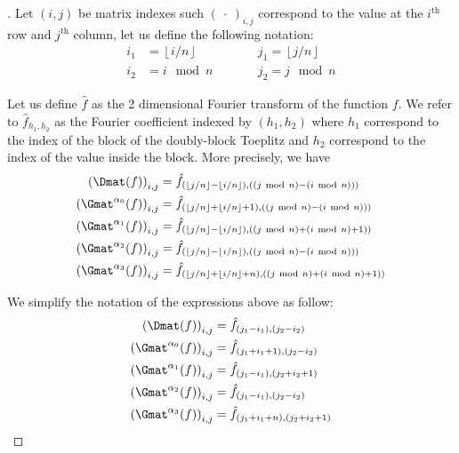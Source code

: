 \begin{proof}[]
Let $(i, j)$ be matrix indexes such $(\ \cdot\ )_{i, j}$ correspond to the value at the $i^\textrm{th}$ row and $j^\textrm{th}$ column, let us define the following notation:
\begin{align*}
    i_1 &= \left\lfloor i/n \right\rfloor \quad \quad &&j_1 = \left\lfloor j/n \right\rfloor \\
    i_2 &= i \mod n \quad \quad &&j_2 = j \mod n
\end{align*}

\noindent
Let us define $\hat{f}$ as the 2 dimensional Fourier transform of the function $f$. We refer to $\hat{f}_{h_1, h_2}$ as the Fourier coefficient indexed by $(h_1, h_2)$ where $h_1$ correspond to the index of the block of the doubly-block Toeplitz and $h_2$ correspond to the index of the value inside the block. More precisely, we have 
\begin{align}
    \leftmat \Dmat(f) \rightmat_{i, j} &= \hat{f}_{(\left\lfloor j/n \right\rfloor - \left\lfloor i/n \right\rfloor), ((j \mod n) - (i \mod n)))} \label{equation:expression_fourier} \\
    \leftmat \Gmat^{\alpha_0}(f) \rightmat_{i, j} &= \hat{f}_{(\left\lfloor j/n \right\rfloor + \left\lfloor i/n \right\rfloor + 1), ((j \mod n) - (i \mod n)))} \\
    \leftmat \Gmat^{\alpha_1}(f) \rightmat_{i, j} &= \hat{f}_{(\left\lfloor j/n \right\rfloor - \left\lfloor i/n \right\rfloor), ((j \mod n) + (i \mod n) + 1))} \\
    \leftmat \Gmat^{\alpha_2}(f) \rightmat_{i, j} &= \hat{f}_{(\left\lfloor j/n \right\rfloor - \left\lfloor i/n \right\rfloor), ((j \mod n) - (i \mod n)))} \\
    \leftmat \Gmat^{\alpha_3}(f) \rightmat_{i, j} &= \hat{f}_{(\left\lfloor j/n \right\rfloor + \left\lfloor i/n \right\rfloor + n), ((j \mod n) + (i \mod n) + 1))}
\end{align}

\noindent
We simplify the notation of the expressions above as follow:
\begin{align}
    \leftmat \Dmat(f) \rightmat_{i, j} &= \hat{f}_{(j_1 - i_1), (j_2 - i_2 )} \\
    \leftmat \Gmat^{\alpha_0}(f) \rightmat_{i, j} &= \hat{f}_{(j_1 + i_1 + 1), (j_2 - i_2 )} \\
    \leftmat \Gmat^{\alpha_1}(f) \rightmat_{i, j} &= \hat{f}_{(j_1 - i_1), (j_2 + i_2 + 1)} \\
    \leftmat \Gmat^{\alpha_2}(f) \rightmat_{i, j} &= \hat{f}_{(j_1 - i_1), (j_2 - i_2 )} \\
    \leftmat \Gmat^{\alpha_3}(f) \rightmat_{i, j} &= \hat{f}_{(j_1 + i_1 + n), (j_2 + i_2 + 1)}
\end{align}


\end{proof}
